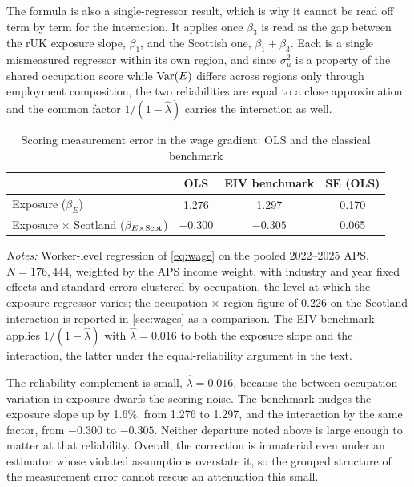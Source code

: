 The formula is also a single-regressor result, which is why it cannot be read off term by term for the interaction. It applies once $\beta_3$ is read as the gap between the rUK exposure slope, $\beta_1$, and the Scottish one, $\beta_1 + \beta_3$. Each is a single mismeasured regressor within its own region, and since $\sigma^2_u$ is a property of the shared occupation score while $\operatorname{Var}(E)$ differs across regions only through employment composition, the two reliabilities are equal to a close approximation and the common factor $1/(1 - \widehat{\lambda})$ carries the interaction as well.

\begin{table}[h]
\centering
\caption{Scoring measurement error in the wage gradient: OLS and the classical benchmark}
\label{tab:eiv}
\small
\begin{tabular}{lccc}
\toprule
 & OLS & EIV benchmark & SE (OLS) \\
\midrule
Exposure ($\beta_E$) & 1.276 & 1.297 & 0.170 \\
Exposure $\times$ Scotland ($\beta_{E \times \mathrm{Scot}}$) &
  $-0.300$ & $-0.305$ & 0.065 \\
\bottomrule
\end{tabular}
\begin{minipage}{0.95\textwidth}
\vspace{0.4em}\footnotesize
\textit{Notes:} Worker-level regression of \cref{eq:wage} on the pooled 2022--2025 APS, $N = 176{,}444$, weighted by the APS income weight, with industry and year fixed effects and standard errors clustered by occupation, the level at which the exposure regressor varies; the occupation $\times$ region figure of 0.226 on the Scotland interaction is reported in \cref{sec:wages} as a comparison. The EIV benchmark applies $1/(1 - \widehat{\lambda})$ with $\widehat{\lambda} = 0.016$ to both the exposure slope and the interaction, the latter under the equal-reliability argument in the text.
\end{minipage}
\end{table}

The reliability complement is small, $\widehat{\lambda} = 0.016$, because the between-occupation variation in exposure dwarfs the scoring noise. The benchmark nudges the exposure slope up by 1.6\%, from 1.276 to 1.297, and the interaction by the same factor, from $-0.300$ to $-0.305$. Neither departure noted above is large enough to matter at that reliability. Overall, the correction is immaterial even under an estimator whose violated assumptions overstate it, so the grouped structure of the measurement error cannot rescue an attenuation this small.


